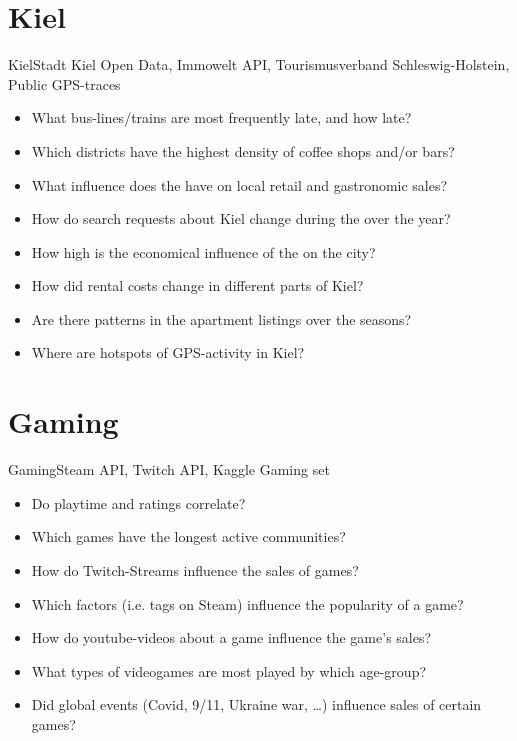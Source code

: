     \section{Kiel}
    \begin{frame}{Kiel}{Stadt Kiel Open Data, Immowelt API, Tourismusverband Schleswig-Holstein, Public GPS-traces}
        \begin{itemize}[<+->]
            \item What bus-lines/trains are most frequently late, and how late?
            \item Which districts have the highest density of coffee shops and/or bars?
            \item What influence does the  have on local retail and gastronomic sales?
            \item How do search requests about Kiel change during the  over the year?
            \item How high is the economical influence of the  on the city?
            \item How did rental costs change in different parts of Kiel?
            \item Are there patterns in the apartment listings over the seasons?
            \item Where are hotspots of GPS-activity in Kiel?
        \end{itemize}
    \end{frame}

    \section{Gaming}
    \begin{frame}{Gaming}{Steam API, Twitch API, Kaggle Gaming set}
        \begin{itemize}[<+->]
            \item Do playtime and ratings correlate?
            \item Which games have the longest active communities?
            \item How do Twitch-Streams influence the sales of games?
            \item Which factors (i.e. tags on Steam) influence the popularity of a game?
            \item How do youtube-videos about a game influence the game's sales?
            \item What types of videogames are most played by which age-group?
            \item Did global events (Covid, 9/11, Ukraine war, \dots) influence sales of certain games?
        \end{itemize}
    \end{frame}

